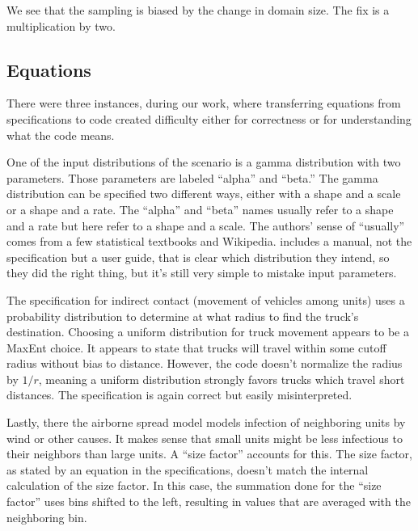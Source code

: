 \documentclass{article}
\begin{document}
We see that the sampling is biased by the change in domain
size. The fix is a multiplication by two.


\subsection{Equations}
There were three instances, during our work, where
transferring equations from specifications to code
created difficulty either for correctness or for understanding
what the code means.

One of the input distributions of the \hpai scenario is
a gamma distribution with two parameters. Those parameters
are labeled ``alpha'' and ``beta.'' The gamma distribution
can be specified two different ways, either with a
shape and a scale or a shape and a rate. The ``alpha'' and
``beta'' names usually refer to a shape and a rate but here
refer to a shape and a scale. The authors' sense of ``usually''
comes from a few statistical textbooks and Wikipedia.
\naadsm includes a manual, not the specification but a user
guide, that is clear which distribution they intend, so they
did the right thing, but it's still very simple to mistake
input parameters.

The \naadsm specification for indirect contact (movement of
vehicles among units) uses a probability distribution to
determine at what radius to find the truck's destination.
Choosing a uniform distribution for truck movement appears
to be a MaxEnt choice. It appears to state that trucks
will travel within some cutoff radius without bias to
distance. However, the code doesn't normalize the radius
by $1/r$, meaning a uniform distribution strongly favors
trucks which travel short distances. The specification is
again correct but easily misinterpreted.

Lastly, there the airborne spread model models infection
of neighboring units by wind or other causes. It
makes sense that small units might be less infectious
to their neighbors than large units. A ``size factor''
accounts for this. The size factor, as stated by
an equation in the specifications, doesn't match
the internal calculation of the size factor.
In this case, the summation done for the ``size factor'' uses
bins shifted to the left, resulting in values that are
averaged with the neighboring bin.

\end{document}
